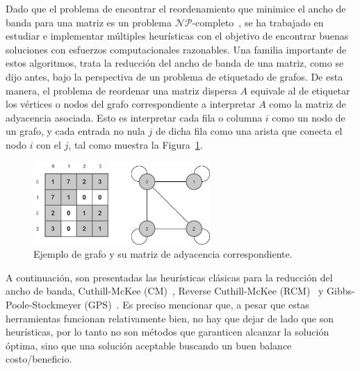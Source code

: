 Dado que el problema de encontrar el reordenamiento que minimice el ancho de banda para una matriz es un problema $\mathcal{NP}$-completo~\cite{Papadimitriou1976}, se ha trabajado en estudiar e implementar múltiples heurísticas con el objetivo de encontrar buenas soluciones con esfuerzos computacionales razonables. Una familia importante de estos algoritmos, trata la reducción del ancho de banda de una matriz, como se dijo antes, bajo la perspectiva de un problema de etiquetado de grafos. De esta manera, el problema de reordenar una matriz dispersa $A$ equivale al de etiquetar los vértices o nodos del grafo correspondiente a interpretar $A$ como la matriz de adyacencia asociada. Esto es interpretar cada fila o columna $i$ como un nodo de un grafo, y cada entrada no nula $j$ de dicha fila como una arista que conecta el nodo $i$ con el $j$, tal como muestra la Figura~\ref{fig:adjacency-matrix}. %

\begin{figure}
    \centering
    \includegraphics[width=0.6\textwidth]{imagenes/chapter2/adjacency-matrix.png}
    \caption{Ejemplo de grafo y su matriz de adyacencia correspondiente.}
    \label{fig:adjacency-matrix}
\end{figure}  



A continuación, son presentadas las heurísticas clásicas para la reducción del ancho de banda, Cuthill-McKee (CM)~\cite{Cuthill-Mckee}, Reverse Cuthill-McKee (RCM)~\cite{alan-phdthesis} y Gibbs-Poole-Stockmeyer (GPS)~\cite{Gibbs1976}. Es preciso mencionar que, a pesar que estas herramientas funcionan relativamente bien, no hay que dejar de lado que son  heurísticas, por lo tanto no son métodos que garanticen alcanzar la solución óptima, sino que una solución aceptable buscando un buen balance costo/beneficio.

